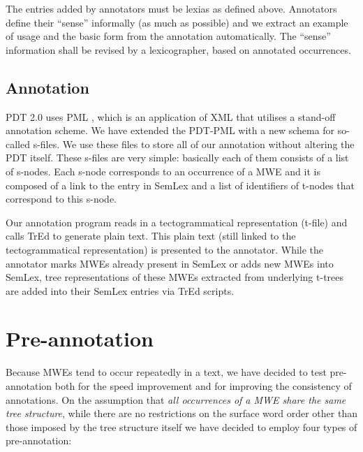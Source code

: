 \documentclass[11pt]{article}
\begin{document}
The entries added by annotators must be lexias as defined above. Annotators define their ``sense'' informally (as much as possible) and we extract an example of usage and the basic form from the annotation automatically. The ``sense'' information shall be revised by a lexicographer, based on annotated occurrences.


\subsection{Annotation}
\label{sec:meth:annot}

PDT 2.0 uses PML \cite{pajas:2005}, \newline{}which is an application of XML that utilises a stand-off annotation scheme. We have extended the PDT-PML with a new schema for so-called s-files. We use these files to store all of our annotation without altering the PDT itself.
These s-files are very simple: basically each of them consists of a list of s-nodes. Each s-node corresponds to an occurrence of a MWE and it is composed of a link to the entry in SemLex and a list of identifiers of t-nodes that correspond to this s-node.

Our annotation program reads in a tectogrammatical representation (t-file) and calls TrEd \cite{pajas:tred} to generate plain text. This plain text (still linked to the tectogrammatical representation) is presented to the annotator. While the annotator marks MWEs already present in SemLex or adds new MWEs into SemLex, tree representations of these MWEs extrac\-ted from underlying t-trees are added into their SemLex entries via TrEd scripts. 



\section{Pre-annotation}
\label{sec:pre}
Because MWEs tend to occur repeatedly in a text, we have decided to test pre-annotation both for the speed improvement and for improving the consistency of annotations. 
On the assumption that {\it all occurrences of a MWE share the same tree structure}, while there are no restrictions on the surface word order other than those imposed by the tree structure itself
%
we have decided to employ four types of pre-annotation:
\end{document}
